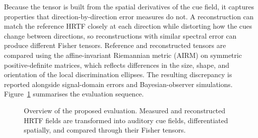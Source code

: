 \documentclass[journal]{IEEEtran}
\begin{document}
Because the tensor is built from the spatial derivatives of the cue field, it captures properties that direction-by-direction error measures do not. A reconstruction can match the reference HRTF closely at each direction while distorting how the cues change between directions, so reconstructions with similar spectral error can produce different Fisher tensors. Reference and reconstructed tensors are compared using the affine-invariant Riemannian metric (AIRM) on symmetric positive-definite matrices, which reflects differences in the size, shape, and orientation of the local discrimination ellipses. The resulting discrepancy is reported alongside signal-domain errors and Bayesian-observer simulations. Figure~\ref{fig:evaluation_pipeline} summarises the evaluation sequence.
\begin{figure}[t]
    \centering
    \caption{Overview of the proposed evaluation. Measured and reconstructed HRTF fields are transformed into auditory cue fields, differentiated spatially, and compared through their Fisher tensors.}
    \label{fig:evaluation_pipeline}
\end{figure}
\end{document}
